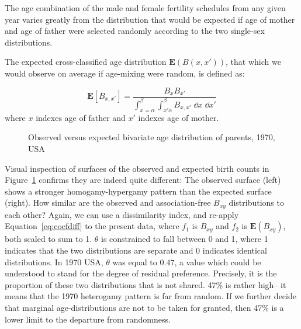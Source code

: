  \FloatBarrier
The age combination of the male and female fertility schedules from
any given year varies greatly from the distribution that would be expected if
age of mother and age of father were selected randomly according to the two
single-sex distributions.

The expected cross-classified age distribution $\textbf{E}(B(x,x'))$, that which
we would observe on average if age-mixing were random, is defined as:

\begin{equation}
\label{eq:expected}
\textbf{E}\left[B_{x,x'}\right] = \frac{B_x B_{x'}}{\int _{x = \alpha} ^\beta
\int _{x' \alpha} ^\beta B_{x,x'} \; \dd x \;\dd x'}
\end{equation}
where $x$ indexes age of father and $x'$ indexes age of mother.

\begin{figure}[ht!]
        \centering  
          \caption{Observed versus expected bivariate age distribution of
          parents, 1970, USA}
          \label{fig:US1970obsexp}
\end{figure}

Visual inspection of surfaces of the observed and expected birth counts in
Figure~\ref{fig:US1970obsexp} confirms they are indeed quite different: The
observed surface (left) shows a stronger homogamy-hypergamy pattern than the
expected surface (right). How similar are the
observed and association-free $B_{xy}$ distributions to each other? Again, we
can use a dissimilarity index, and re-apply Equation~\ref{eq:coefdiff} to the
present data, where $f_1$ is $B_{xy}$ and $f_2$ is $\textbf{E}(B_{xy})$, both scaled 
to sum to 1. $\theta$ is constrained to fall between 0 and 1, where 1 indicates that the
two distributions are separate and 0 indicates identical distributions. In 1970 USA,
$\theta$ was equal to $0.47$, a value which could be understood to stand for the
degree of residual preference. Precisely, it is the proportion of these two
distributions that is not shared. 47\% is rather high-- it means that the 1970
heterogamy pattern is far from random. If we further decide that marginal
age-distributions are not to be taken for granted, then 47\% is a lower limit to
the departure from randomness.

